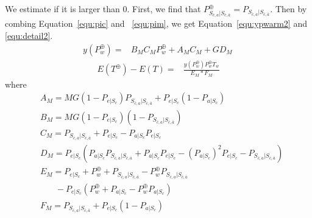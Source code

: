 We estimate if it is larger than $0$.
First, we find that $P_{S_{\bar{c}, a}|S_{\bar{c},\bar{a}}}^{\oplus} = P_{S_{\bar{c}, a}|S_{\bar{c},\bar{a}}}$.
Then by combing Equation~\ref{equ:pic} and ~\ref{equ:pim}, we get Equation~\ref{equ:ypwarm2} and \ref{equ:detail2}.
\begin{equation}
\label{equ:ypwarm2}
\begin{split}
y(P_{w}^{\oplus}) = &B_{M}C_{M}P_{w}^{\oplus}+A_{M}C_{M}+GD_{M} \,
\end{split}\end{equation}
\begin{equation}
\label{equ:detail2}
\begin{split}
E(T^{\oplus}) - E(T) = &\frac{y(P_{w}^{\oplus})P_{w}^{\oplus}T_{w}}{E_{M}*F_{M}}
\end{split}\end{equation}
where
\begin{equation*}
\begin{split}
&A_{M}= MG(1-P_{e|S_{c}})P_{S_{\bar{c}, a}|S_{\bar{c},\bar{a}}}+P_{e|S_{c}}(1-P_{a|S_{c}})\\
&B_{M}=MG(1-P_{e|S_{c}})(1-P_{S_{\bar{c}, a}|S_{\bar{c},\bar{a}}})\\
&C_{M}=P_{S_{\bar{c}, a}|S_{\bar{c},\bar{a}}}+P_{e|S_{c}}-P_{a|S_{c}}P_{e|S_{c}}\\
&D_{M}=P_{e|S_{c}}(P_{a|S_{c}}P_{S_{\bar{c}, a}|S_{\bar{c},\bar{a}}}+P_{a|S_{c}}P_{e|S_{c}}-(P_{a|S_{c}})^2P_{e|S_{c}}-P_{S_{\bar{c}, a}|S_{\bar{c},\bar{a}}})\\
&E_{M}=P_{e|S_{c}}+P_{w}^{\oplus}+P_{S_{\bar{c}, a}|S_{\bar{c},\bar{a}}}-P_{w}^{\oplus}P_{S_{\bar{c}, a}|S_{\bar{c},\bar{a}}} \\& \ \ \ \ \ \ \ \ -P_{e|S_{c}}(P_{w}^{\oplus}+P_{a|S_{c}}-P_{w}^{\oplus}P_{a|S_{c}})\\
&F_{M}=P_{S_{\bar{c}, a}|S_{\bar{c},\bar{a}}}+P_{e|S_{c}}(1-P_{a|S_{c}})
\end{split}\end{equation*}

